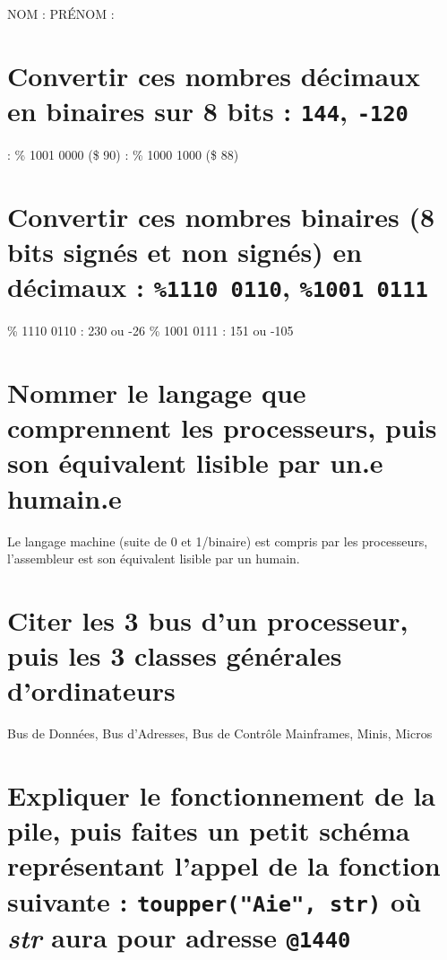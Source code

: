 \documentclass[11pt,a4paper]{article}
\author{Fabrice BOISSIER}
\begin{document}
\setlength{\fboxrule}{2pt}

\noindent {}

\bigskip

NOM : \hspace{6.5cm} PR\'ENOM :

\smallskip

\section{Convertir ces nombres décimaux en binaires sur 8 bits : \texttt{144}, \texttt{-120}}

 : \% 1001 0000 (\$ 90)	 : \% 1000 1000 (\$ 88)
\bigskip

\section{Convertir ces nombres binaires (8 bits signés et non signés) en décimaux : \texttt{\%1110 0110}, \texttt{\%1001 0111}}

\bigskip
\% 1110 0110 : 230 ou -26	\qquad	\% 1001 0111 : 151 ou -105
\bigskip

\section{Nommer le langage que comprennent les processeurs, puis son équivalent lisible par un.e humain.e}

\bigskip
Le langage machine (suite de 0 et 1/binaire) est compris par les processeurs, l'assembleur est son équivalent lisible par un humain.
\bigskip

\section{Citer les 3 bus d'un processeur, puis les 3 classes générales d'ordinateurs}

\bigskip
Bus de Données, Bus d'Adresses, Bus de Contrôle \qquad Mainframes, Minis, Micros
\bigskip

\section{Expliquer le fonctionnement de la pile, puis faites un petit schéma représentant l'appel de la fonction suivante : \texttt{toupper("Aie", str)} où \textit{str} aura pour adresse \texttt{@1440}}
\end{document}
